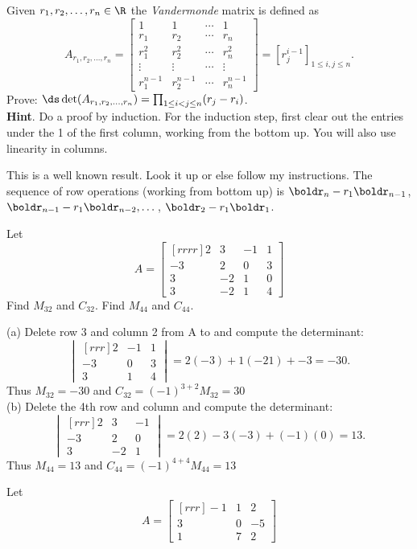 \ii Given $r_1, r_2, \dots, r_n\in \R$ the {\em Vandermonde} matrix is defined as 
\[
A_{r_1,r_2,\dots, r_n}=\begin{bmatrix}
1&1&\cdots &1\\
r_1&r_2&\cdots & r_n\\
r_1^2&r_2^2&\cdots &r_n^2\\
\vdots & \vdots &\cdots &\vdots\\
r_1^{n-1}&r_2^{n-1}&\cdots &r_n^{n-1}
\end{bmatrix}=[r_j^{i-1}]_{1\leq i,j\leq n}.
\] 
Prove: $\ds\det (A_{r_1,r_2,\dots, r_n})=\prod_{1\leq i<j\leq n}(r_j-r_i)$. 
\\
{\bf Hint}. Do a proof by induction. For the induction step, first clear out the entries under the 1 of the first column, working from the bottom up. You will also use linearity in columns. 
\begin{solution}
\noindent This is a well known result. Look it up or else follow my instructions. The sequence of row operations (working from bottom up) is $\boldr_n-r_1\boldr_{n-1}$, $\boldr_{n-1}-r_1\boldr_{n-2},\dots$, $\boldr_2-r_1\boldr_1$. 
\end{solution} 
\ii Let 
$$A =
\begin{bmatrix}[rrrr]
2&3&-1&1\\
-3&2&0&3\\
3&-2&1&0\\
3&-2&1&4
\end{bmatrix}
$$
\bb
\ii Find $M_{32}$ and $C_{32}$.
\ii Find $M_{44}$ and $C_{44}$.
\ee
\begin{solution}
\noindent
(a) Delete row 3 and column 2 from A to and compute the determinant:
\[
\begin{vmatrix}[rrr]
2&-1&1\\
-3&0&3\\
3&1&4
\end{vmatrix}
=2(-3)+1(-21)+-3=-30.
\]
Thus $M_{32} = -30$ and $C_{32} = (-1)^{3+2}M_{32} = 30$
\\
(b) Delete the 4th row and column and compute the determinant:
\[
\begin{vmatrix}[rrr]
2&3&-1\\
-3&2&0\\
3&-2&1
\end{vmatrix}
=2(2)-3(-3)+(-1)(0)=13.
\]
Thus $M_{44} = 13$ and $C_{44} = (-1)^{4+4}M_{44} = 13$
\end{solution}
\ii Let 
$$A =
\begin{bmatrix}[rrr]
-1&1&2\\
3&0&-5\\
1&7&2
\end{bmatrix}
$$
